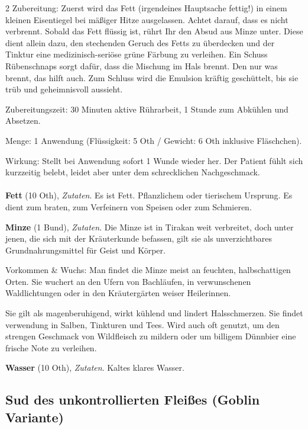 \begin{multicols}{2}
    Zubereitung:
Zuerst wird das Fett (irgendeines Hauptsache fettig!) in einem kleinen Eisentiegel bei mäßiger Hitze ausgelassen. Achtet darauf, dass es nicht verbrennt. Sobald das Fett flüssig ist, rührt Ihr den Absud aus Minze unter. Diese dient allein dazu, den stechenden Geruch des Fetts zu überdecken und der Tinktur eine medizinisch-seriöse grüne Färbung zu verleihen. Ein Schuss Rübenschnaps sorgt dafür, dass die Mischung im Hals brennt. Den nur was brennt, das hilft auch. Zum Schluss wird die Emulsion kräftig geschüttelt, bis sie trüb und geheimnisvoll aussieht.

Zubereitungszeit: 30 Minuten aktive Rührarbeit, 1 Stunde zum Abkühlen und Absetzen.

Menge: 1 Anwendung (Flüssigkeit: 5 Oth / Gewicht: 6 Oth inklusive Fläschchen).

Wirkung: Stellt bei Anwendung sofort 1 Wunde wieder her. Der Patient fühlt sich kurzzeitig belebt, leidet aber unter dem schrecklichen Nachgeschmack.

    \paragraph{}
    \begin{denseitemize}
        \item \textbf{Fett} (10 Oth), \textit{Zutaten}.
        Es ist Fett. Pflanzlichem oder tierischem Ursprung. Es dient zum braten, zum Verfeinern von Speisen oder zum Schmieren.
        \item \textbf{Minze} (1 Bund), \textit{Zutaten}.
        Die Minze ist in Tirakan weit verbreitet, doch unter jenen, die sich mit der Kräuterkunde befassen, gilt sie als unverzichtbares Grundnahrungsmittel für Geist und Körper.

Vorkommen \& Wuchs:
Man findet die Minze meist an feuchten, halbschattigen Orten. Sie wuchert an den Ufern von Bachläufen, in verwunschenen Waldlichtungen oder in den Kräutergärten weiser Heilerinnen. 

Sie gilt als magenberuhigend, wirkt kühlend und lindert Halsschmerzen. Sie findet verwendung in Salben, Tinkturen und Tees. Wird auch oft genutzt, um den strengen Geschmack von Wildfleisch zu mildern oder um billigem Dünnbier eine frische Note zu verleihen.
        \item \textbf{Wasser} (10 Oth), \textit{Zutaten}.
        Kaltes klares Wasser.
    \end{denseitemize}


    \subsection*{Sud des unkontrollierten Fleißes (Goblin Variante)}


\end{multicols}
